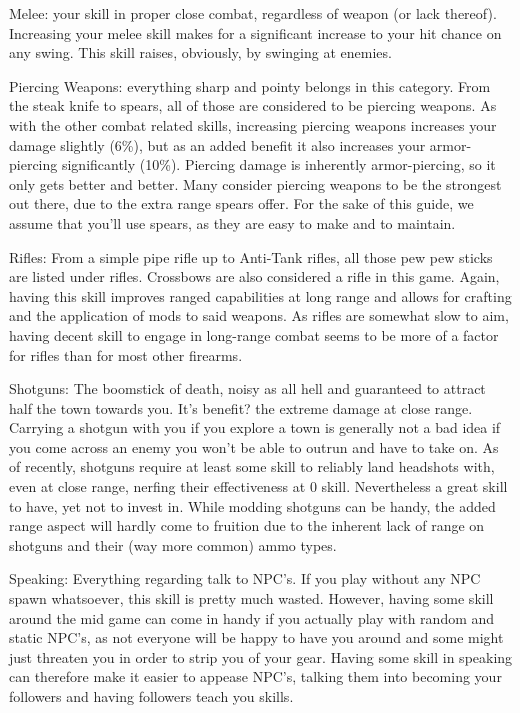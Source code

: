 \documentclass[11pt]{report}
\begin{document}
Melee: your skill in proper close combat, regardless of weapon (or lack thereof). Increasing your melee skill makes for a significant increase to your hit chance on any swing. This skill raises, obviously, by swinging at enemies.

Piercing Weapons: everything sharp and pointy belongs in this category. From the steak knife to spears, all of those are considered to be piercing weapons. As with the other combat related skills, increasing piercing weapons increases your damage slightly (6\%), but as an added benefit it also increases your armor-piercing significantly (10\%). Piercing damage is inherently armor-piercing, so it only gets better and better. Many consider piercing weapons to be the strongest out there, due to the extra range spears offer. For the sake of this guide, we assume that you'll use spears, as they are easy to make and to maintain.

Rifles: From a simple pipe rifle up to Anti-Tank rifles, all those pew pew sticks are listed under rifles. Crossbows are also considered a rifle in this game. Again, having this skill improves ranged capabilities at long range and allows for crafting and the application of mods to said weapons. As rifles are somewhat slow to aim, having decent skill to engage in long-range combat seems to be more of a factor for rifles than for most other firearms.

Shotguns: The boomstick of death, noisy as all hell and guaranteed to attract half the town towards you. It's benefit? the extreme damage at close range. Carrying a shotgun with you if you explore a town is generally not a bad idea if you come across an enemy you won't be able to outrun and have to take on. As of recently, shotguns require at least some skill to reliably land headshots with, even at close range, nerfing their effectiveness at 0 skill. Nevertheless a great skill to have, yet not to invest in. While modding shotguns can be handy, the added range aspect will hardly come to fruition due to the inherent lack of range on shotguns and their (way more common) ammo types.

Speaking: Everything regarding talk to NPC's. If you play without any NPC spawn whatsoever, this skill is pretty much wasted. However, having some skill around the mid game can come in handy if you actually play with random and static NPC's, as not everyone will be happy to have you around and some might just threaten you in order to strip you of your gear. Having some skill in speaking can therefore make it easier to appease NPC's, talking them into becoming your followers and having followers teach you skills.
\end{document}
